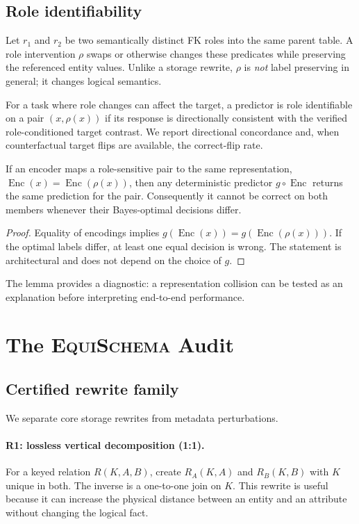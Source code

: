 \documentclass[runningheads]{llncs}
\newcommand{\method}{\textsc{EquiSchema}\xspace}
\newcommand{\enc}{\operatorname{Enc}}
\begin{document}
\subsection{Role identifiability}
Let $r_1$ and $r_2$ be two semantically distinct FK roles into the same parent table. A role intervention $\rho$ swaps or otherwise changes these predicates while preserving the referenced entity values. Unlike a storage rewrite, $\rho$ is \emph{not} label preserving in general; it changes logical semantics.

\begin{definition}
For a task where role changes can affect the target, a predictor is role identifiable on a pair $(x,\rho(x))$ if its response is directionally consistent with the verified role-conditioned target contrast. We report directional concordance and, when counterfactual target flips are available, the correct-flip rate.
\end{definition}

\begin{lemma}\label{lem:collision}
If an encoder maps a role-sensitive pair to the same representation, $\enc(x)=\enc(\rho(x))$, then any deterministic predictor $g\circ\enc$ returns the same prediction for the pair. Consequently it cannot be correct on both members whenever their Bayes-optimal decisions differ.
\end{lemma}
\begin{proof}
Equality of encodings implies $g(\enc(x))=g(\enc(\rho(x)))$. If the optimal labels differ, at least one equal decision is wrong. The statement is architectural and does not depend on the choice of $g$.
\end{proof}
The lemma provides a diagnostic: a representation collision can be tested as an explanation before interpreting end-to-end performance.

\section{The \method Audit}\label{sec:method}
\subsection{Certified rewrite family}
We separate core storage rewrites from metadata perturbations.

\paragraph{R1: lossless vertical decomposition (1:1).}
For a keyed relation $R(K,A,B)$, create $R_A(K,A)$ and $R_B(K,B)$ with $K$ unique in both. The inverse is a one-to-one join on $K$. This rewrite is useful because it can increase the physical distance between an entity and an attribute without changing the logical fact.
\end{document}
